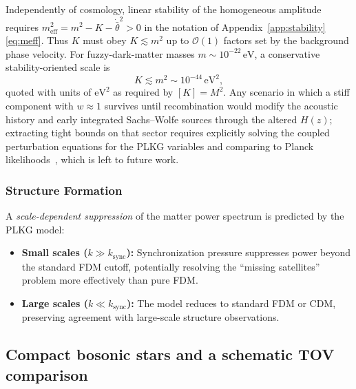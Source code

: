 Independently of cosmology, linear stability of the homogeneous amplitude requires $m_{\mathrm{eff}}^2=m^2-K-\dot{\bar{\theta}}^2>0$ in the notation of Appendix~\ref{app:stability} \eqref{eq:meff}.
Thus $K$ must obey $K\lesssim m^2$ up to $\mathcal{O}(1)$ factors set by the background phase velocity.
For fuzzy-dark-matter masses $m\sim 10^{-22}\,\mathrm{eV}$, a conservative stability-oriented scale is
\begin{equation}
K\lesssim m^2\sim 10^{-44}\,\mathrm{eV}^2,
\label{eq:K-stability-scale}
\end{equation}
quoted with units of $\mathrm{eV}^2$ as required by $[K]=M^2$.
Any scenario in which a stiff component with $w\approx 1$ survives until recombination would modify the acoustic history and early integrated Sachs--Wolfe sources through the altered $H(z)$; extracting tight bounds on that sector requires explicitly solving the coupled perturbation equations for the PLKG variables and comparing to Planck likelihoods~\cite{Planck2018}, which is left to future work.

\subsubsection{Structure Formation}
A \emph{scale-dependent suppression} of the matter power spectrum is predicted by the PLKG model:
\begin{itemize}
    \item \textbf{Small scales ($k \gg k_{\text{sync}}$):} Synchronization pressure suppresses power beyond the standard FDM cutoff, potentially resolving the ``missing satellites'' problem more effectively than pure FDM.
    \item \textbf{Large scales ($k \ll k_{\text{sync}}$):} The model reduces to standard FDM or CDM, preserving agreement with large-scale structure observations.
\end{itemize}

\subsection{Compact bosonic stars and a schematic TOV comparison}
\label{subsec:tov-compact}

